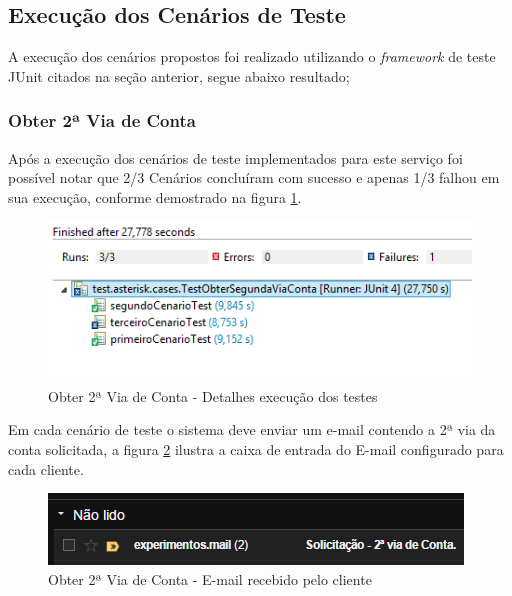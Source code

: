\subsection{Execução dos Cenários de Teste}


A execução dos cenários propostos foi realizado utilizando o \textit{framework} de teste JUnit citados na seção anterior, segue abaixo resultado; 

\subsubsection{Obter 2ª Via de Conta}
 
 Após a execução dos cenários de teste implementados para este serviço foi possível notar que 2/3 Cenários concluíram com sucesso e apenas 1/3 falhou em sua execução, conforme demostrado na figura \ref{figura:segundaViaJUnit}.		
	\begin{figure}[H]
		\centering
		\caption{Obter 2ª Via de Conta - Detalhes execução dos testes}
		\label{figura:segundaViaJUnit}
		\includegraphics{figuras/cenarios/segunda_via/junit_result.PNG}
	\end{figure}
	

Em cada cenário de teste o sistema deve enviar um e-mail contendo a 2ª via da conta solicitada, a figura \ref{figura:emailRecebido} ilustra a caixa de entrada do E-mail configurado para cada cliente.
	\begin{figure}[H]
		\centering
		\caption{Obter 2ª Via de Conta - E-mail recebido pelo cliente}
		\label{figura:emailRecebido}
		\includegraphics{figuras/cenarios/segunda_via/envio_email.PNG}
	\end{figure}

